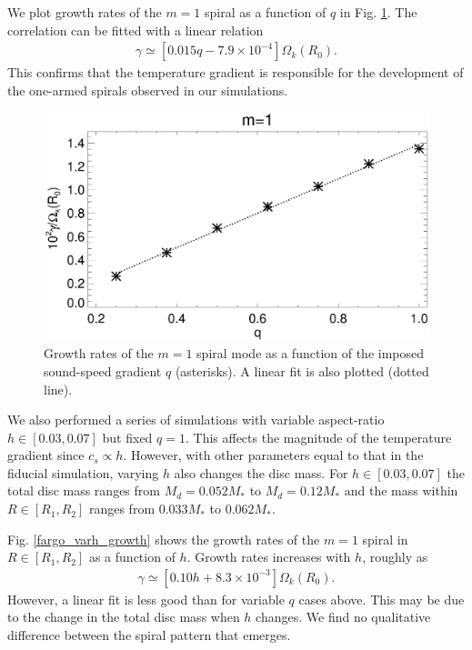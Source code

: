 We plot growth rates of the $m=1$ spiral as a function of $q$ in 
Fig. \ref{fargo_varq_growth}. The correlation can be fitted with a
linear relation
\begin{align*}
  \gamma \simeq \left[0.015 q - 7.9\times10^{-4}\right] \Omega_k(R_0). 
\end{align*}
This confirms that the temperature gradient is responsible for the
development of the one-armed spirals observed in our simulations. 
\begin{figure}
  \includegraphics[width=\linewidth]{figures/m1_analysis_plot_ratemax_fargo_varq.ps}    
  \caption{Growth rates of the $m=1$ spiral mode as a function of the
    imposed sound-speed gradient $q$ (asterisks). A linear fit is also
    plotted (dotted line). 
    \label{fargo_varq_growth}} 
\end{figure}

We also performed a series of simulations with variable aspect-ratio
$h\in[0.03,0.07]$ but fixed $q=1$. This affects the magnitude of the temperature
gradient since $c_s \propto h$. However, with other parameters equal
to that in the fiducial simulation,  varying $h$ also changes the disc
mass. For $h\in[0.03,0.07]$ the total disc mass ranges from
$M_d=0.052M_*$ to $M_d=0.12M_*$ and the 
mass within $R\in[R_1,R_2]$  ranges from $0.033M_*$ to $0.062M_*$. 

Fig. \ref{fargo_varh_growth} shows the growth rates of the $m=1$
spiral in $R\in[R_1,R_2]$ as a function of $h$. Growth rates increases
with $h$, roughly as  
\begin{align}
  \gamma \simeq \left[0.10h + 8.3\times10^{-3}\right]\Omega_k(R_0).  
\end{align}
However, a linear fit is less good than for variable $q$ cases above. This
may be due to the change in the total disc mass when $h$ changes. We
find no qualitative difference between the spiral pattern that
emerges. 

